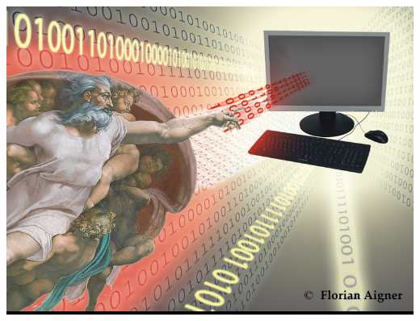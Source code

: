 





\begin{frame}[plain]
\colorbox{black}{\includegraphics[width=\textwidth]{Images/Transitions/GodComputerC}}
\end{frame}

